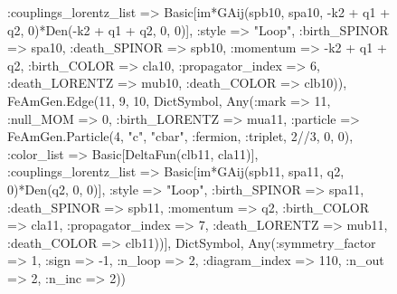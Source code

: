 \documentclass{revtex4}
\begin{document}
\begin{figure}[!htb]
\begin{center}
{:couplings_lorentz_list => Basic[im*GAij(spb10, spa10, -k2 + q1 + q2, 0)*Den(-k2 + q1 + q2, 0, 0)], :style => "Loop", :birth_SPINOR => spa10, :death_SPINOR => spb10, :momentum => -k2 + q1 + q2, :birth_COLOR => cla10, :propagator_index => 6, :death_LORENTZ => mub10, :death_COLOR => clb10)), FeAmGen.Edge(11, 9, 10, Dict{Symbol, Any}(:mark => 11, :null_MOM => 0, :birth_LORENTZ => mua11, :particle => FeAmGen.Particle(4, "c", "cbar", :fermion, :triplet, 2//3, 0, 0), :color_list => Basic[DeltaFun(clb11, cla11)], :couplings_lorentz_list => Basic[im*GAij(spb11, spa11, q2, 0)*Den(q2, 0, 0)], :style => "Loop", :birth_SPINOR => spa11, :death_SPINOR => spb11, :momentum => q2, :birth_COLOR => cla11, :propagator_index => 7, :death_LORENTZ => mub11, :death_COLOR => clb11))], Dict{Symbol, Any}(:symmetry_factor => 1, :sign => -1, :n_loop => 2, :diagram_index => 110, :n_out => 2, :n_inc => 2)) 
}
\end{center}
\end{figure}
\end{document}
